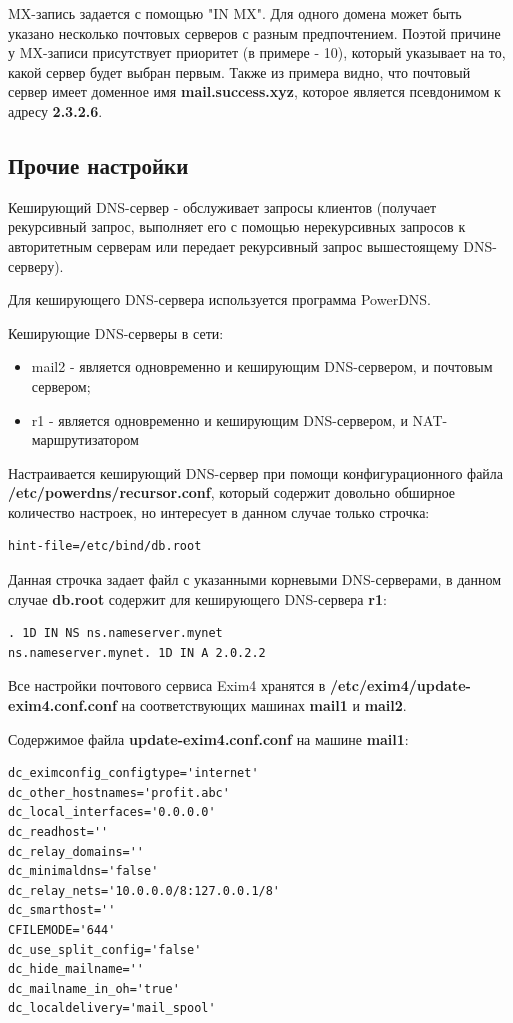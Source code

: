 \documentclass[a4paper,12pt]{article}
\begin{document}
MX-запись задается с помощью "IN MX". Для одного домена может быть указано несколько почтовых серверов с разным предпочтением. Поэтой причине у MX-записи присутствует приоритет (в примере - 10), который указывает на то, какой сервер будет выбран первым. Также из примера видно, что почтовый сервер имеет доменное имя \textbf{mail.success.xyz}, которое является псевдонимом к адресу \textbf{2.3.2.6}.

\subsection{Прочие настройки}

Кеширующий DNS-сервер - обслуживает запросы клиентов (получает рекурсивный запрос, выполняет его с помощью нерекурсивных запросов к авторитетным серверам или передает рекурсивный запрос вышестоящему DNS-серверу).

Для кеширующего DNS-сервера используется программа PowerDNS. 

Кеширующие DNS-серверы в сети:
\begin{itemize}
\item mail2 - является одновременно и кеширующим DNS-сервером, и почтовым сервером;
\item r1 - является одновременно и кеширующим DNS-сервером, и NAT-маршрутизатором
\end{itemize}

Настраивается кеширующий DNS-сервер при помощи конфигурационного файла \textbf{/etc/powerdns/recursor.conf}, который содержит довольно обширное количество настроек, но интересует в данном случае только строчка:
\begin{verbatim}
hint-file=/etc/bind/db.root
\end{verbatim}

Данная строчка задает файл с указанными корневыми DNS-серверами, в данном случае \textbf{db.root} содержит для кеширующего DNS-сервера \textbf{r1}:
\begin{verbatim}
. 1D IN NS ns.nameserver.mynet
ns.nameserver.mynet. 1D IN A 2.0.2.2
\end{verbatim}

Все настройки почтового сервиса Exim4 хранятся в \textbf{/etc/exim4/update-exim4.conf.conf} на соответствующих машинах \textbf{mail1} и \textbf{mail2}.

Содержимое файла \textbf{update-exim4.conf.conf} на машине \textbf{mail1}:
\begin{verbatim}
dc_eximconfig_configtype='internet'
dc_other_hostnames='profit.abc'
dc_local_interfaces='0.0.0.0'
dc_readhost=''
dc_relay_domains=''
dc_minimaldns='false'
dc_relay_nets='10.0.0.0/8:127.0.0.1/8'
dc_smarthost=''
CFILEMODE='644'
dc_use_split_config='false'
dc_hide_mailname=''
dc_mailname_in_oh='true'
dc_localdelivery='mail_spool'
\end{verbatim} 
\end{document}
